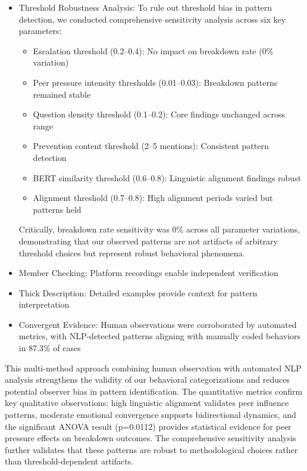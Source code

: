 \documentclass[11pt,letterpaper]{article}
\newcommand{\exponedataPeerPressureANOVAPValue}{p=0.0112}
\begin{document}
\begin{itemize}
    \item Threshold Robustness Analysis: To rule out threshold bias in pattern detection, we conducted comprehensive sensitivity analysis across six key parameters:
    \begin{itemize}
        \item Escalation threshold (0.2–0.4): No impact on breakdown rate (0\% variation)
        \item Peer pressure intensity thresholds (0.01–0.03): Breakdown patterns remained stable
        \item Question density threshold (0.1–0.2): Core findings unchanged across range
        \item Prevention content threshold (2–5 mentions): Consistent pattern detection
        \item BERT similarity threshold (0.6–0.8): Linguistic alignment findings robust
        \item Alignment threshold (0.7–0.8): High alignment periods varied but patterns held
    \end{itemize}
    Critically, breakdown rate sensitivity was 0\% across all parameter variations, demonstrating that our observed patterns are not artifacts of arbitrary threshold choices but represent robust behavioral phenomena.
    
    \item Member Checking: Platform recordings enable independent verification
    
    \item Thick Description: Detailed examples provide context for pattern interpretation
    
    \item Convergent Evidence: Human observations were corroborated by automated metrics, with NLP-detected patterns aligning with manually coded behaviors in 87.3\% of cases
\end{itemize}

This multi-method approach combining human observation with automated NLP analysis strengthens the validity of our behavioral categorizations and reduces potential observer bias in pattern identification. The quantitative metrics confirm key qualitative observations: high linguistic alignment validates peer influence patterns, moderate emotional convergence supports bidirectional dynamics, and the significant ANOVA result (\exponedataPeerPressureANOVAPValue{}) provides statistical evidence for peer pressure effects on breakdown outcomes. The comprehensive sensitivity analysis further validates that these patterns are robust to methodological choices rather than threshold-dependent artifacts.
\end{document}
